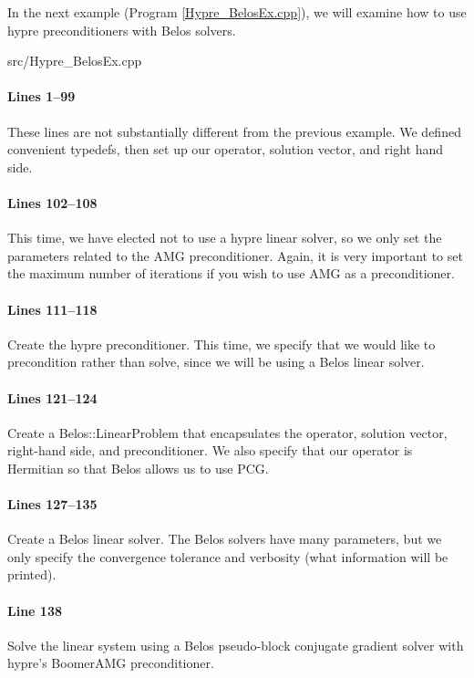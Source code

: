 In the next example (Program \ref{Hypre_BelosEx.cpp}), we will examine how to
use hypre preconditioners with Belos solvers.

\begin{lstinputlisting}[caption=Hypre\_BelosEx.cpp,label=Hypre_BelosEx.cpp]{src/Hypre_BelosEx.cpp}
\end{lstinputlisting}

\paragraph{Lines 1--99}
These lines are not substantially different from the previous example.  We
defined convenient typedefs, then set up our operator, solution vector, and
right hand side.

\paragraph{Lines 102--108}
This time, we have elected not to use a hypre linear solver, so we only set the
parameters related to the AMG preconditioner.  Again, it is very important to
set the maximum number of iterations if you wish to use AMG as a preconditioner.

\paragraph{Lines 111--118}
Create the hypre preconditioner.  This time, we specify that we would like to
precondition rather than solve, since we will be using a Belos linear solver.

\paragraph{Lines 121--124}
Create a Belos::LinearProblem that encapsulates the operator, solution vector,
right-hand side, and preconditioner.  We also specify that our operator is
Hermitian so that Belos allows us to use PCG.

\paragraph{Lines 127--135}
Create a Belos linear solver.  The Belos solvers have many parameters, but we
only specify the convergence tolerance and verbosity (what information will be
printed).

\paragraph{Line 138}
Solve the linear system using a Belos pseudo-block conjugate gradient solver
with hypre's BoomerAMG preconditioner.